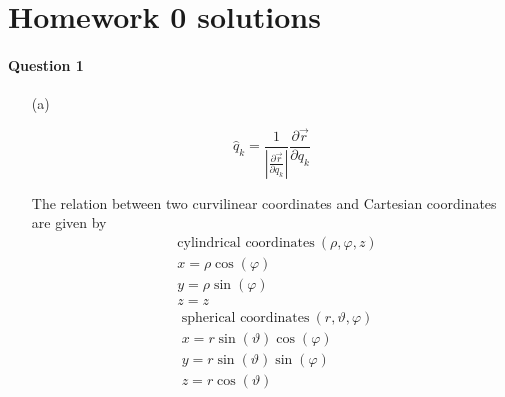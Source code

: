 \documentclass[11pt,a4paper]{article}
\author{Zehao Gao}
\begin{document}
\section*{Homework 0 solutions}

\paragraph{Question 1}

\begin{enumerate}
\item[(a)]

\begin{equation}
\hat{q}_k=\frac{1}{|\frac{\partial\vec{r}}{\partial q_k}|}\frac{\partial\vec{r}}{\partial q_k}
\end{equation}

The relation between two curvilinear coordinates and Cartesian coordinates are given by
\begin{align*}
&\textrm{cylindrical coordinates}\ (\rho,\varphi,z)\\
&x=\rho\cos(\varphi)\\
&y=\rho\sin(\varphi)\\
&z=z
\end{align*}
\begin{align*}
&\textrm{spherical coordinates}\ (r,\vartheta,\varphi)\\
&x=r\sin(\vartheta)\cos(\varphi)\\
&y=r\sin(\vartheta)\sin(\varphi)\\
&z=r\cos(\vartheta)
\end{align*}


\end{enumerate}
\end{document}
